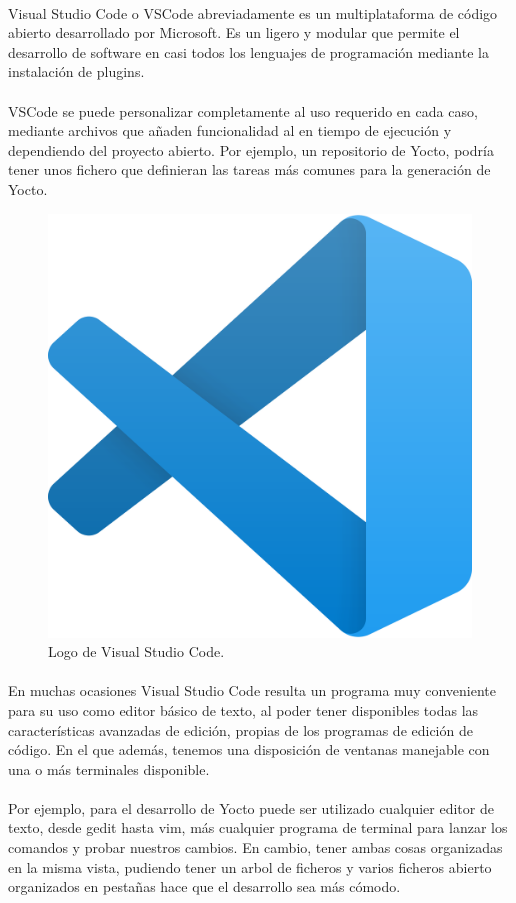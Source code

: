 \paragraph{}Visual Studio Code o VSCode abreviadamente es un  multiplataforma
de código abierto desarrollado por Microsoft. Es un  ligero y modular
que permite el desarrollo de software en casi todos los lenguajes de programación mediante
la instalación de \gls{plugins}.

\paragraph{}VSCode se puede personalizar completamente al uso requerido en cada caso,
mediante archivos que añaden funcionalidad al  en tiempo de ejecución
y dependiendo del proyecto abierto. Por ejemplo, un repositorio de Yocto, podría tener unos
fichero que definieran las tareas más comunes para la generación de Yocto.

\begin{figure}[H]
	\centering
	\includegraphics[width=0.30\linewidth]{imgs/vscode-logo}
	\caption[Visual Studio Code]{Logo de Visual Studio Code.}
	\label{fig:vscode-log}
\end{figure}

\paragraph{}En muchas ocasiones Visual Studio Code resulta un programa muy conveniente
para su uso como editor básico de texto, al poder tener disponibles todas las características
avanzadas de edición, propias de los programas de edición de código. En el que además,
tenemos una disposición de ventanas manejable con una o más terminales disponible.

\paragraph{}Por ejemplo, para el desarrollo de Yocto puede ser utilizado cualquier editor
de texto, desde gedit hasta vim, más cualquier programa de terminal para lanzar los
comandos y probar nuestros cambios. En cambio, tener ambas cosas organizadas en la misma
vista, pudiendo tener un arbol de ficheros y varios ficheros abierto organizados en pestañas
hace que el desarrollo sea más cómodo.


